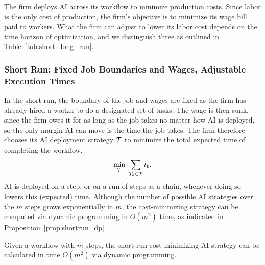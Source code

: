 The firm deploys AI across its workflow to minimize production costs.
Since labor is the only cost of production, the firm's objective is to minimize its wage bill paid to workers.
What the firm can adjust to lower its labor cost depends on the time horizon of optimization, and we distinguish three as outlined in Table~\ref{tab:short_long_run}.

\subsubsection{Short Run: Fixed Job Boundaries and Wages, Adjustable Execution Times}
\label{sec:model.shortrun}
In the short run, the boundary of the job and wages are fixed as the firm has already hired a worker to do a designated set of tasks.
The wage is then sunk, since the firm owes it for as long as the job takes no matter how AI is deployed, so the only margin AI can move is the time the job takes.
The firm therefore chooses its AI deployment strategy $\mathcal{T}$ to minimize the total expected time of completing the workflow,
\begin{align}
\label{eq:totalcost_shortterm}
\min_{\mathcal{T}} \ \sum_{T_b \in \mathcal{T}} t_{b}.
\end{align}
AI is deployed on a step, or on a run of steps as a chain, whenever doing so lowers this (expected) time.
Although the number of possible AI strategies over the $m$ steps grows exponentially in $m$, the cost-minimizing strategy can be computed via dynamic programming in $O(m^2)$ time, as indicated in Proposition~\ref{prop:shortrun_dp}.

\begin{proposition}
\label{prop:shortrun_dp}
Given a workflow with $m$ steps, the short-run cost-minimizing AI strategy can be calculated in time $O(m^2)$ via dynamic programming.
\end{proposition}

